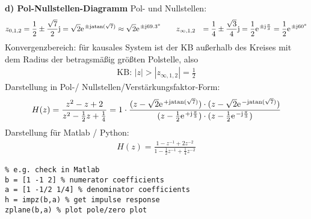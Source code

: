 \begin{Loesung}
\noindent\textbf{d) Pol-Nullstellen-Diagramm}
Pol- und Nullstellen:
\begin{align}
z_{0,1,2} &= \frac{1}{2} \pm \frac{\sqrt{7}}{2}\im = \sqrt{2} \e^{\pm \im \mathrm{atan}(\sqrt{7})} \approx \sqrt{2} \e^{\pm \im 69.3^\circ}\qquad
z_{\infty,1,2} &= \frac{1}{4} \pm \frac{\sqrt{3}}{4}\im = \frac{1}{2}\e^{\pm \im \frac{\pi}{3}} = \frac{1}{2}\e^{\pm \im 60^\circ}
\end{align}
Konvergenzbereich: für kausales System ist der KB außerhalb des Kreises mit dem Radius
der betragsmäßig größten Polstelle, also
\begin{align}
\text{KB: } |z| > |z_{\infty,1,2}| = \frac{1}{2}
\end{align}
%
Darstellung in Pol-/ Nullstellen/Verstärkungsfaktor-Form:
\begin{align}
H(z) = \frac{z^2 - z + 2}{z^2 - \frac{1}{2}z + \frac{1}{4}}
= 1 \cdot \frac
{(z-\sqrt{2} \e^{+\im \mathrm{atan}(\sqrt{7})}) \cdot (z-\sqrt{2} \e^{-\im \mathrm{atan}(\sqrt{7})})}
{(z-\frac{1}{2}\e^{+\im \frac{\pi}{3}}) \cdot (z-\frac{1}{2}\e^{-\im \frac{\pi}{3}})}
\end{align}
%
Darstellung für Matlab / Python:
\begin{align}
H(z) = \frac{1 - z^{-1} + 2 z^{-2}}{1 - \frac{1}{2} z^{-1} + \frac{1}{4} z^{-2}}
\end{align}
\begin{verbatim}
% e.g. check in Matlab
b = [1 -1 2] % numerator coefficients
a = [1 -1/2 1/4] % denominator coefficients
h = impz(b,a) % get impulse response
zplane(b,a) % plot pole/zero plot
\end{verbatim}


\end{Loesung}
